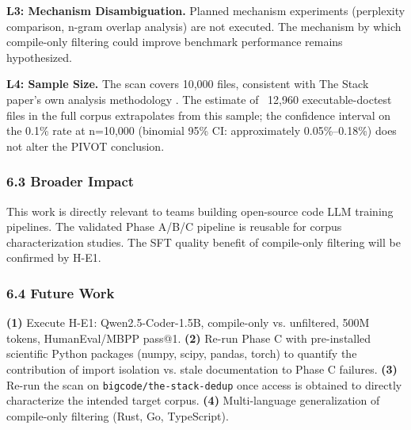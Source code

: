 \textbf{L3: Mechanism Disambiguation.} Planned mechanism experiments (perplexity comparison,
n-gram overlap analysis) are not executed. The mechanism by which compile-only filtering
could improve benchmark performance remains hypothesized.

\textbf{L4: Sample Size.} The scan covers 10,000 files, consistent with The Stack paper's own
analysis methodology \citep{Kocetkov2022}. The estimate of ~12,960 executable-doctest
files in the full corpus extrapolates from this sample; the confidence interval on the 0.1\%
rate at n=10,000 (binomial 95\% CI: approximately 0.05\%--0.18\%) does not alter the PIVOT
conclusion.

\subsubsection{6.3 Broader Impact}

This work is directly relevant to teams building open-source code LLM training pipelines.
The validated Phase A/B/C pipeline is reusable for corpus characterization studies. The
SFT quality benefit of compile-only filtering will be confirmed by H-E1.

\subsubsection{6.4 Future Work}

\textbf{(1)} Execute H-E1: Qwen2.5-Coder-1.5B, compile-only vs. unfiltered, 500M tokens,
HumanEval/MBPP pass@1.
\textbf{(2)} Re-run Phase C with pre-installed scientific Python packages (numpy, scipy, pandas,
torch) to quantify the contribution of import isolation vs. stale documentation to Phase C
failures.
\textbf{(3)} Re-run the scan on \texttt{bigcode/the-stack-dedup} once access is obtained to directly
characterize the intended target corpus.
\textbf{(4)} Multi-language generalization of compile-only filtering (Rust, Go, TypeScript).

